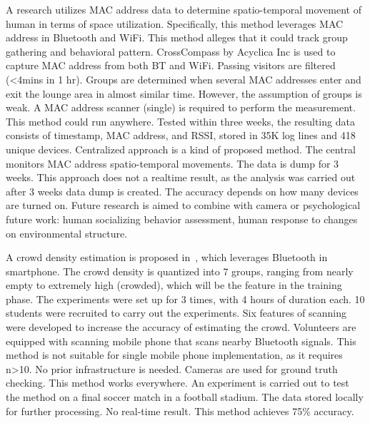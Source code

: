 \documentclass{article}
\begin{document}

A research \cite{thesis017} utilizes MAC address data to determine spatio-temporal movement of human in terms of space utilization. Specifically, this method leverages MAC address in Bluetooth and WiFi. This method alleges that it could track group gathering and behavioral pattern. CrossCompass by Acyclica Inc is used to capture MAC address from both BT and WiFi. Passing visitors are filtered (<4mins in 1 hr). Groups are determined when several MAC addresses enter and exit the lounge area in almost similar time. However, the assumption of groups is weak. A MAC address scanner (single) is required to perform the measurement. This method could run anywhere. Tested within three weeks, the resulting data consists of timestamp, MAC address, and RSSI, stored in 35K log lines and 418 unique devices. Centralized approach is a kind of proposed method. The central monitors MAC address spatio-temporal movements. The data is dump for 3 weeks. This approach does not a realtime result, as the analysis was carried out after 3 weeks data dump is created. The accuracy depends on how many devices are turned on. Future research is aimed to combine with camera or psychological future work: human socializing behavior assessment, human response to changes on environmental structure.

A crowd density estimation is proposed in~\cite{thesis008}, which leverages Bluetooth in smartphone. The crowd density is quantized into 7 groups, ranging from nearly empty to extremely high (crowded), which will be the feature in the training phase. The experiments were set up for 3 times, with 4 hours of duration each. 10 students were recruited to carry out the experiments. Six features of scanning were developed to increase the accuracy of estimating the crowd. Volunteers are equipped with scanning mobile phone that scans nearby Bluetooth signals. This method is not suitable for single mobile phone implementation, as it requires n>10. No prior infrastructure is needed. Cameras are used for ground truth checking. This method works everywhere. An experiment is carried out to test the method on a final soccer match in a football stadium. The data stored locally for further processing. No real-time result. This method achieves 75\% accuracy.
\end{document}
